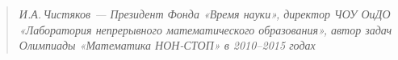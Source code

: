 \begin{quote}
\itshape И.А.\,Чистяков — Президент Фонда «Время науки», директор ЧОУ ОиДО «Лаборатория непрерывного математического образования», автор задач Олимпиады «Математика НОН-СТОП» в 2010–2015 годах
\end{quote}